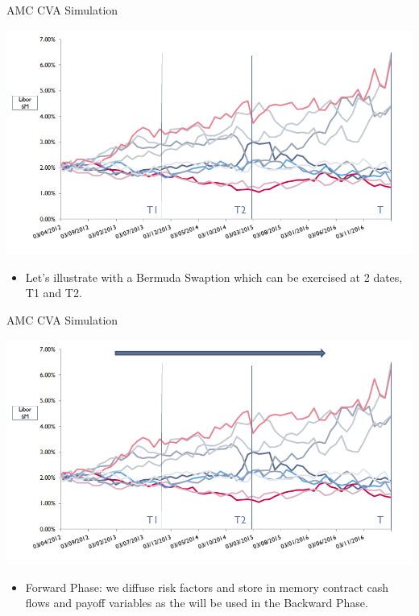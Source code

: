 \documentclass[11pt]{beamer}
\begin{document}
\begin{frame}{AMC CVA Simulation}
\begin{center}
\includegraphics[scale=.4]{img/AMC1.PNG} 
\end{center}
\begin{itemize}
\scriptsize
\item Let's illustrate with a Bermuda Swaption which can be exercised at 2 dates, T1 and T2. 
\normalsize
\end{itemize}
\end{frame}
\begin{frame}{AMC CVA Simulation}
\begin{center}
\includegraphics[scale=.4]{img/AMC2.PNG} 
\end{center}
\begin{itemize}
\scriptsize
\item Forward Phase: we diffuse risk factors and store in memory contract cash flows and payoff variables as the will be used in the Backward Phase.
\normalsize
\end{itemize}
\end{frame}
\end{document}
